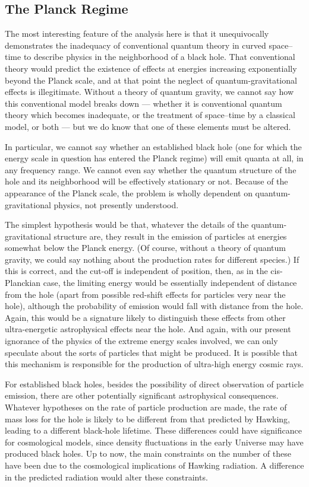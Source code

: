\documentclass[12pt]{article}
\begin{document}
\subsection{The Planck Regime}

The most interesting feature of the analysis here is that it unequivocally
demonstrates the inadequacy of conventional quantum theory in curved
space--time to describe physics in the neighborhood of a black hole.  That
conventional theory would predict the existence of effects at energies
increasing exponentially beyond the Planck scale, and at that point the neglect
of quantum-gravitational effects is illegitimate.   Without a theory of quantum
gravity, we cannot say how this conventional model breaks down --- whether it
is conventional quantum theory which becomes inadequate, or the treatment of
space--time by a classical model, or both --- but we do
know that one of these elements must be altered.  

In particular, we cannot say whether an established black hole (one for which
the energy scale in question has entered the Planck regime) will emit quanta at
all, in any frequency range.  We cannot even say whether the quantum structure
of the hole and its neighborhood
will be effectively stationary or not.  Because of the appearance of the
Planck scale, the problem is wholly dependent on quantum-gravitational
physics, not presently understood.

The simplest hypothesis would be that, whatever the details of the
quantum-gravitational structure are, they result in the emission of particles
at energies somewhat below the Planck energy.  (Of course, without a theory of
quantum gravity, we could say nothing about the production rates for different
species.) If this is correct, and the cut-off is independent of position, then,
as in the cis-Planckian case, the limiting energy would be essentially
independent of distance from the hole (apart from possible red-shift effects
for particles very near the hole), although the  probability of emission would
fall with distance from the hole. Again, this would be a signature likely to
distinguish these effects from other ultra-energetic astrophysical effects near
the hole.  And again, with our present ignorance of the physics of the extreme
energy scales involved, we can only speculate about the sorts of particles that
might be produced.  It is possible that this mechanism is responsible for the
production of ultra-high energy cosmic rays.  

For established black holes, besides the  possibility of direct observation of 
particle emission,  there are other potentially significant astrophysical
consequences. Whatever hypotheses on the rate of particle production are made,
the rate of mass loss for the hole is likely to be different from
that predicted by Hawking, leading to a different black-hole
lifetime. These differences could have significance for cosmological models,
since density fluctuations in the early Universe may have produced black
holes.  Up to now, the main constraints on the number of these have been due to
the cosmological implications of Hawking radiation.  A difference in the
predicted radiation would alter these constraints.
\end{document}

